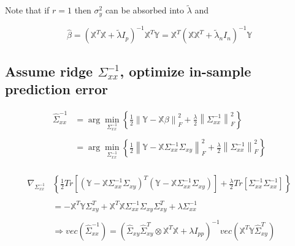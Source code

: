 \documentclass[11pt,]{book}
\theoremstyle{definition}
\theoremstyle{definition}
\theoremstyle{definition}
\theoremstyle{remark}
\begin{document}
Note that if \(r = 1\) then \(\sigma_{y}^{2}\) can be absorbed into
\(\tilde{\lambda}\) and

\[ \hat{\beta} = \left( \mathbb{X}^{T}\mathbb{X} + \tilde{\lambda}I_{p} \right)^{-1}\mathbb{X}^{T}\mathbb{Y} = \mathbb{X}^{T}\left( \mathbb{X}\mathbb{X}^{T} + \tilde{\lambda}_{n}I_{n} \right)^{-1}\mathbb{Y} \]

\vspace{0.5cm}

\hypertarget{assume-ridge-sigma_xx-1-optimize-in-sample-prediction-error}{%
\subsection{\texorpdfstring{Assume ridge \(\Sigma_{xx}^{-1}\), optimize
in-sample prediction
error}{Assume ridge \textbackslash{}Sigma\_\{xx\}\^{}\{-1\}, optimize in-sample prediction error}}\label{assume-ridge-sigma_xx-1-optimize-in-sample-prediction-error}}

\begin{align*}
  \hat{\Sigma}_{xx}^{-1} &= \arg\min_{\Sigma_{xx}^{-1}}\left\{ \frac{1}{2}\left\| \mathbb{Y} - \mathbb{X}\mathbb{\beta} \right\|_{F}^{2} + \frac{\lambda}{2}\left\| \Sigma_{xx}^{-1} \right\|_{F}^{2} \right\} \\
  & \\
  &= \arg\min_{\Sigma_{xx}^{-1}}\left\{ \frac{1}{2}\left\| \mathbb{Y} - \mathbb{X}\Sigma_{xx}^{-1}\Sigma_{xy} \right\|_{F}^{2} + \frac{\lambda}{2}\left\| \Sigma_{xx}^{-1} \right\|_{F}^{2} \right\} \\
\end{align*}

\begin{align*}
  \nabla_{\Sigma_{xx}^{-1}}&\left\{ \frac{1}{2}Tr\left[ \left(\mathbb{Y} - \mathbb{X}\Sigma_{xx}^{-1}\Sigma_{xy} \right)^{T}\left(\mathbb{Y} - \mathbb{X}\Sigma_{xx}^{-1}\Sigma_{xy} \right) \right] + \frac{\lambda}{2}Tr\left[ \Sigma_{xx}^{-1}\Sigma_{xx}^{-1} \right] \right\} \\
  & \\
  &= -\mathbb{X}^{T}\mathbb{Y}\Sigma_{xy}^{T} + \mathbb{X}^{T}\mathbb{X}\Sigma_{xx}^{-1}\Sigma_{xy}\Sigma_{xy}^{T} + \lambda\Sigma_{xx}^{-1} \\
  & \\
  &\Rightarrow vec\left( \hat{\Sigma}_{xx}^{-1} \right) = \left(\hat{\Sigma}_{xy}\hat{\Sigma}_{xy}^{T} \otimes \mathbb{X}^{T}\mathbb{X} + \lambda I_{pp} \right)^{-1}vec\left( \mathbb{X}^{T}\mathbb{Y}\hat{\Sigma}_{xy}^{T} \right) \\
\end{align*}
\end{document}
